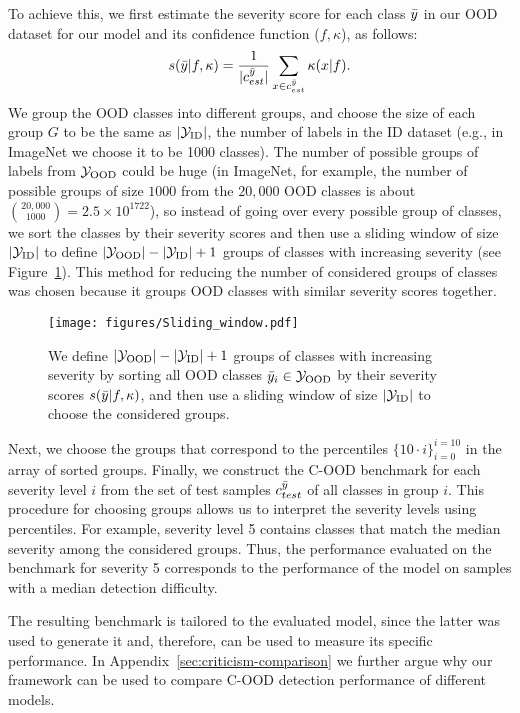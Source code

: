 \documentclass[table]{article} \usepackage{PRIMEarxiv}
\newcommand{\cY}{{\cal Y}}
\begin{document}
To achieve this, we first estimate the severity score for each class $\Bar{y}$ in our OOD dataset for our model and its confidence function ($f, \kappa$), as follows:
$$s(\Bar{y}|f, \kappa) = \frac{1}{|c_{est}^{\Bar{y}}|} \sum_{x \in c_{est}^{\Bar{y}}} \kappa(x|f) . $$
We group the OOD classes into different groups, and choose the size of each group $G$
to be the same as $|\cY_{\text{ID}}|$, the number of labels in the ID dataset (e.g., in ImageNet we choose it to be 1000 classes). The number of possible groups of labels from $\cY_{\text{OOD}}$ could be huge (in ImageNet, for example, the number of possible groups of size $1000$ from the $20,000$ OOD classes is about ${20,000 \choose 1000}=2.5\times10^{1722}$), so instead of going over every possible group of classes, we sort the classes by their severity scores and then use a sliding window of size $|\cY_{\text{\text{ID}}}|$ to define $|\cY_{\text{OOD}}| - |\cY_{\text{\text{ID}}}| + 1$ groups of classes with increasing severity (see Figure~\ref{fig:sliding_window}). 
This method for reducing the number of considered groups of classes was chosen because it groups OOD classes with similar severity scores together.
\begin{figure*}[h]
    \centering
    \texttt{[image: figures/Sliding\_window.pdf]}
    \caption{We define $|\cY_{\text{OOD}}| - |\cY_{\text{\text{ID}}}| + 1$ groups of classes with increasing severity by sorting all OOD classes $\Bar{y}_{i} \in \cY_{\text{OOD}}$ by their severity scores $s(\Bar{y}|f, \kappa)$, and then use a sliding window of size $|\cY_{\text{ID}}|$ to choose the considered groups.}
    \label{fig:sliding_window}
\end{figure*}

Next, we choose the groups that correspond to the percentiles $\{10\cdot i\}_{i=0}^{i=10}$ in the array of sorted groups.
Finally, we construct the C-OOD benchmark for each severity level $i$ from the set of test samples $c_{test}^{\Bar{y}}$ of all classes in group $i$. 
This procedure for choosing groups allows us to interpret the severity levels using percentiles. 
For example, severity level 5 contains classes that match the median severity among the considered groups. Thus, the performance evaluated on the benchmark for 
severity 5 corresponds to the performance of the model on samples with a median detection difficulty.

The resulting benchmark is tailored to the evaluated model, since the latter was used to generate it and, therefore, can be used to measure its specific performance. In Appendix~\ref{sec:criticism-comparison} we further argue why our framework can be used to compare C-OOD detection performance of different models.
\end{document}
